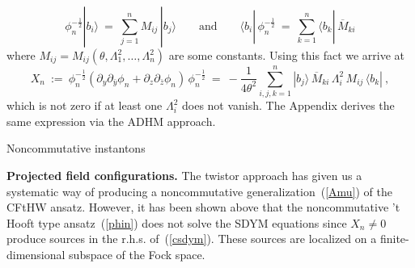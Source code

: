 \documentclass[a4paper,11pt]{article}
\makeatletter
\renewcommand{\section}{\@startsection{section}{1}{0pt}{\medskipamount}
{\medskipamount}{\large\bf}}
\numberwithin{equation}{section}
\def\th{\theta}
\def\pa{\mbox{$\partial$}}
\def\>{\rangle}
\def\<{\langle}
\makeatother
\begin{document}
{\begin{equation}
\phi^{-\frac{1}{2}}_n|b_i\>\ =\ \sum_{j=1}^n M_{ij}\,|b_{j}\>
\qquad\textrm{and}\qquad
\<b_i|\,\phi^{-\frac{1}{2}}_n\ =\ \sum_{k=1}^n\<b_k|\,\overline{M}_{ki}
\end{equation}
where $M_{ij} = M_{ij}(\th,\Lambda^2_1,\ldots,\Lambda^2_n)$ are some constants.
Using this fact we arrive at
\begin{equation}\label{x}
X_n\ :=\ \phi_n^{-\frac12}(\pa_y\pa_{\bar y}\phi_n+\pa_z\pa_{\bar z}\phi_n)\,
\phi_n^{-\frac12}\ =\ -\frac{1}{4\th^2}\sum_{i,j,k=1}^n |b_j\>\,
\overline{M}_{ki}\,\Lambda^2_i\,M_{ij}\,\<b_k|\ ,
\end{equation}
which is not zero if at least one $\Lambda^2_i$ does not vanish.
The Appendix derives the same expression via the ADHM approach.

\vfill\eject


\section{Noncommutative instantons}

\noindent
{\bf Projected field configurations.}
The twistor approach has given us a systematic way of producing 
a noncommutative generalization~(\ref{Amu}) of the CFtHW ansatz.
However, it has been shown above that the noncommutative 't Hooft
type ansatz~(\ref{phin}) does not solve the SDYM equations since
$X_n\not=0$ produce sources in the r.h.s. of~(\ref{csdym}).
These sources are localized on a finite-dimensional subspace of
the Fock space.

}
\end{document}
